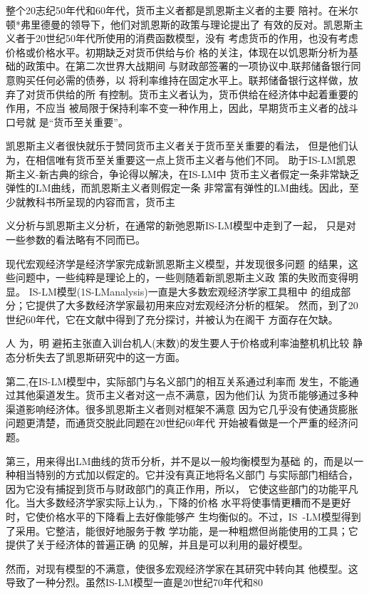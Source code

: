 整个20志纪50年代和60年代，货币主义者都是凯恩斯主义者的主要
陪衬。在米尔顿*弗里德曼的领导下，他们对凯恩斯的政策与理论提出了
有效的反对。凯恩斯主义者于20世纪50年代所使用的消费函数模型，没有
考虑货币的作用，也没有考虑价格或价格水平。初期缺乏对货币供给与价
格的关注，体现在以饥恩斯分析为基础的政策中。在第二次世界大战期间
与财政部签署的一项协议中,联邦储备银行同意购买任何必需的债券，以
将利率维持在固定水平上。联邦储备银行这样做，放弃了对货币供给的所
有控制。货币主义者认为，货币供给在经济体中起着重要的作用，不应当
被局限于保持利率不变一种作用上，因此，早期货币主义者的战斗口号就
是“货币至关重要”。

凯恩斯主义者很快就乐于赞同货币主义者关于货币至关重要的看法，
但是他们认为，在相信唯有货币至关重要这一点上货币主义者与他们不同。
助于IS-LM凯恩斯主义-新古典的综合，争论得以解决，在IS-LM中
货币主义者假定一条非常缺乏弹性的LM曲线，而凯恩斯主义者则假定一条
非常富有弹性的LM曲线。因此，至少就教科书所呈现的内容而言，货币主

义分析与凯恩斯主义分析，在通常的新弛恩斯IS-LM模型中走到了一起，
只是对一些参数的看法略有不同而已。

现代宏观经济学是经济学家完成新凯恩斯主义模型，并发现很多问题
的结果，这些问题中，一些纯粹是理论上的，一些则随着新凯恩斯主义政
策的失败而变得明显。
IS-LM模型(1S-LManalysis)一直是大多数宏观经济学家工具租中
的组成部分；它提供了大多数经济学家最初用来应对宏观经济分析的框架。
然而，到了20世纪60年代，它在文献中得到了充分探讨，并被认为在阁干
方面存在欠缺。

人
为，明
避拓主张直入训台机人(末数)的发生要人于价格或利率油整机机比较
静态分析失去了凯恩斯研究中的这一方面。

第二,在IS-LM模型中，实际部门与名义部门的相互关系通过利率而
发生，不能通过其他渠道发生。货币主义者对这一点不满意，因为他们认
为货币能够通过多种渠道影响经济体。很多凯恩斯主义者则对框架不满意
因为它几乎没有使通货膨胀问题更清楚，而通货交脱此同题在20世纪60年代
开始被看做是一个严重的经济问题。

第三，用来得出LM曲线的货币分析，并不是以一般均衡模型为基础
的，而是以一种相当特别的方式加以假定的。它并没有真正地将名义部门
与实际部门相结合，因为它没有捕捉到货币与财政部门的真正作用，所以，
它使这些部门的功能平凡化。当大多数经济学家实际上认为,，下降的价格
水平将使事情更糟而不是更好时，它使价格水平的下降看上去好像能够产
生均衡似的。不过，IS~-LM模型得到了采用。它整洁，能很好地服务于教
学功能，是一种粗燃但尚能使用的工具；它提供了关于经济体的普遍正确
的见解，并且是可以利用的最好模型。

然而，对现有模型的不满意，使很多宏观经济学家在其研究中转向其
他模型。这导致了一种分烈。虽然IS-LM模型一直是20世纪70年代和80

